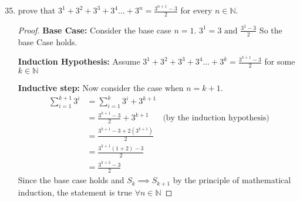 \documentclass{article}
\newcommand{\N}{\mathbb{N}}
\newcommand{\nitem}[1] %
{
	\setcounter{enumi}{#1}
	\addtocounter{enumi}{-1}
	\item
}
\begin{document}
\begin{enumerate}
		\nitem{34} prove that $3^1 + 3^2+ 3^3 + 3^4\hdots+3^n = \frac{3^{n+1}-3}{2}$ for every $n \in \N$.
		\begin{proof}
			\textbf{Base Case:} Consider the base case $n=1$.
			$3^1 = 3 \text{ and } \frac{3^2-3}{2}$
			So the base Case holds.
			
			\textbf{Induction Hypothesis:} Assume $3^1 + 3^2+ 3^3 + 3^4\hdots+3^k = \frac{3^{k+1}-3}{2}$ for some $k \in \N$
			
			\textbf{Inductive step:} Now consider the case when $n=k+1$.
			\begin{align*}
				\sum_{i=1}^{k+1}3^i &= \sum_{i=1}^{k}3^i +3^{k+1} \\
				&= \frac{3^{k+1}-3}{2} +3^{k+1} &\text{(by the induction hypothesis)}\\
				&= \frac{3^{k+1}-3+2(3^{k+1})}{2} \\
				&= \frac{3^{k+1}(1+2)-3}{2}\\
				&= \frac{3^{k+2}-3}{2}
			\end{align*}
			Since the base case holds and $S_k \implies S_{k+1}$ 
			by the principle of mathematical induction, the statement is true $\forall n \in \N$
		\end{proof}
		
	\end{enumerate}
	
\end{document}
